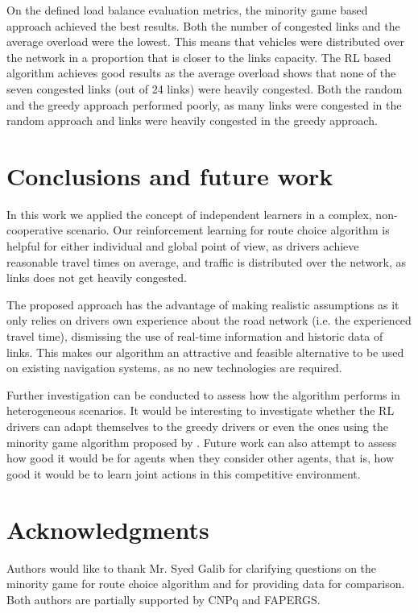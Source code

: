 \documentclass[12pt]{llncs}
\begin{document}
On the defined load balance evaluation metrics, the minority game based approach achieved the best results. Both the number of congested links and the average overload were the lowest. This means that vehicles were distributed over the network in a proportion that is closer to the links capacity. The RL based algorithm achieves good results as the average overload shows that none of the seven congested links (out of 24 links) were heavily congested. Both the random and the greedy approach performed poorly, as many links were congested in the random approach and links were heavily congested in the greedy approach.

\section{Conclusions and future work}
\label{sec:conclusions}

In this work we applied the concept of independent learners in a complex, non-cooperative scenario. Our reinforcement learning for route choice algorithm is helpful for either individual and global point of view, as drivers achieve reasonable travel times on average, and traffic is distributed over the network, as links does not get heavily congested.

The proposed approach has the advantage of making realistic assumptions as it only relies on drivers own experience about the road network (i.e. the experienced travel time), dismissing the use of real-time information and historic data of links. This makes our algorithm an attractive and feasible alternative to be used on existing navigation systems, as no new technologies are required.

Further investigation can be conducted to assess how the algorithm performs in heterogeneous scenarios. It would be interesting to investigate whether the RL drivers can adapt themselves to the greedy drivers or even the ones using the minority game algorithm proposed by \cite{Galib&Moser2011}. Future work can also attempt to assess how good it would be for agents when they consider other agents, that is, how good it would be to learn joint actions in this competitive environment.

\section{Acknowledgments}

Authors would like to thank Mr. Syed Galib for clarifying questions on the minority game for route choice algorithm \cite{Galib&Moser2011} and for providing data for comparison. Both authors are partially supported by CNPq and FAPERGS. %


 
\end{document}

